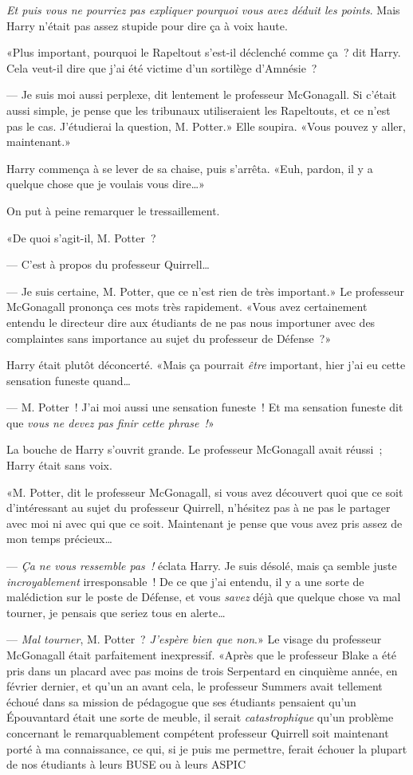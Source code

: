 \emph{Et puis vous ne pourriez pas expliquer pourquoi vous avez déduit les points}. Mais Harry n'était pas assez stupide pour dire ça à voix haute.

«Plus important, pourquoi le Rapeltout s'est-il déclenché comme ça~? dit Harry. Cela veut-il dire que j'ai été victime d'un sortilège d'Amnésie~?

--- Je suis moi aussi perplexe, dit lentement le professeur McGonagall. Si c'était aussi simple, je pense que les tribunaux utiliseraient les Rapeltouts, et ce n'est pas le cas. J'étudierai la question, M. Potter.» Elle soupira. «Vous pouvez y aller, maintenant.»

Harry commença à se lever de sa chaise, puis s'arrêta. «Euh, pardon, il y a quelque chose que je voulais vous dire…»

On put à peine remarquer le tressaillement.

«De quoi s'agit-il, M. Potter~?

--- C'est à propos du professeur Quirrell…

--- Je suis certaine, M. Potter, que ce n'est rien de très important.» Le professeur McGonagall prononça ces mots très rapidement. «Vous avez certainement entendu le directeur dire aux étudiants de ne pas nous importuner avec des complaintes sans importance au sujet du professeur de Défense~?»

Harry était plutôt déconcerté. «Mais ça pourrait \emph{être} important, hier j'ai eu cette sensation funeste quand…

--- M. Potter~! J'ai moi aussi une sensation funeste~! Et ma sensation funeste dit que \emph{vous ne devez pas finir cette phrase~!}»

La bouche de Harry s'ouvrit grande. Le professeur McGonagall avait réussi~; Harry était sans voix.

«M. Potter, dit le professeur McGonagall, si vous avez découvert quoi que ce soit d'intéressant au sujet du professeur Quirrell, n'hésitez pas à ne pas le partager avec moi ni avec qui que ce soit. Maintenant je pense que vous avez pris assez de mon temps précieux…

--- \emph{Ça ne vous ressemble pas~!} éclata Harry. Je suis désolé, mais ça semble juste \emph{incroyablement} irresponsable~! De ce que j'ai entendu, il y a une sorte de malédiction sur le poste de Défense, et vous \emph{savez} déjà que quelque chose va mal tourner, je pensais que seriez tous en alerte…

--- \emph{Mal tourner}, M. Potter~? \emph{J'espère bien que non}.» Le visage du professeur McGonagall était parfaitement inexpressif. «Après que le professeur Blake a été pris dans un placard avec pas moins de trois Serpentard en cinquième année, en février dernier, et qu'un an avant cela, le professeur Summers avait tellement échoué dans sa mission de pédagogue que ses étudiants pensaient qu'un Épouvantard était une sorte de meuble, il serait \emph{catastrophique} qu'un problème concernant le remarquablement compétent professeur Quirrell soit maintenant porté à ma connaissance, ce qui, si je puis me permettre, ferait échouer la plupart de nos étudiants à leurs BUSE ou à leurs ASPIC

